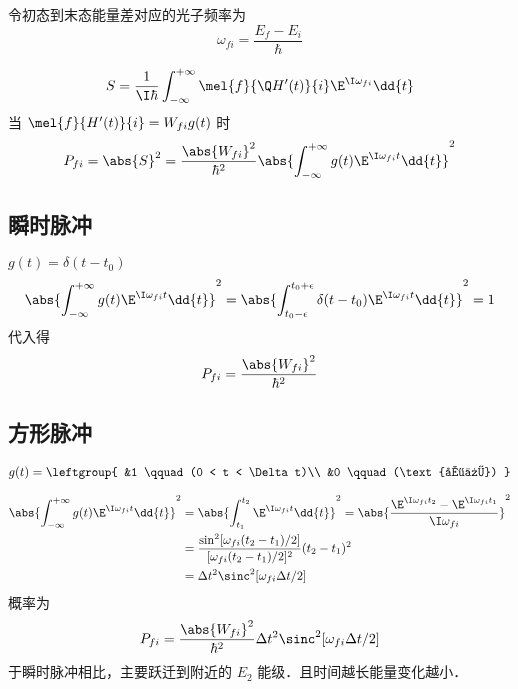 

令初态到末态能量差对应的光子频率为
\begin{equation}
\omega_{fi} = \frac{E_f - E_i}{\hbar}
\end{equation}

\begin{equation}
S = \frac{1}{\I\hbar} \int_{-\infty}^{+\infty} \mel{f}{\Q H'(t)}{i} \E^{\I\omega_{fi}} \dd{t}
\end{equation}
当 $\mel{f}{H'(t)}{i} = W_{fi} g(t)$ 时
\begin{equation}
P_{fi} = \abs{S}^2 = \frac{\abs{W_{fi}}^2}{\hbar^2} \abs{\int_{-\infty}^{+\infty} g(t) \E^{\I\omega_{fi} t} \dd{t}}^2
\end{equation}

\subsection{瞬时脉冲}
$g(t) = \delta(t-t_0)$
\begin{equation}
\abs{\int_{-\infty}^{+\infty} g(t) \E^{\I\omega_{fi} t} \dd{t}}^2
= \abs{\int_{t_0-\epsilon}^{t_0+\epsilon} \delta(t-t_0) \E^{\I\omega_{fi} t} \dd{t}}^2
= 1
\end{equation}
代入得
\begin{equation}
P_{fi} = \frac{\abs{W_{fi}}^2}{\hbar^2}
\end{equation}

\subsection{方形脉冲}
\begin{equation}
g(t) = \leftgroup{
&1 \qquad (0 < t < \Delta t)\\
&0 \qquad (\text{其他})
}\end{equation}

\begin{equation}\begin{aligned}
\abs{\int_{-\infty}^{+\infty} g(t) \E^{\I\omega_{fi}t} \dd{t}}^2
&= \abs{\int_{t_1}^{t_2} \E^{\I\omega_{fi}t} \dd{t}}^2
= \abs{\frac{\E^{\I\omega_{fi}t_2} - \E^{\I\omega_{fi}t_1}}{\I\omega_{fi}}}^2\\
&= \frac{\sin^2[\omega_{fi}(t_2-t_1)/2]}{[\omega_{fi}(t_2-t_1)/2]^2} (t_2-t_1)^2 \\
&= \Delta t^2 \sinc^2[\omega_{fi}\Delta t/2]
\end{aligned}\end{equation}
概率为
\begin{equation}\label{TDPEx_eq2}
P_{fi} = \frac{\abs{W_{fi}}^2}{\hbar^2} \Delta t^2 \sinc^2[\omega_{fi}\Delta t/2]
\end{equation}
于瞬时脉冲相比，主要跃迁到附近的 $E_2$ 能级．且时间越长能量变化越小．

